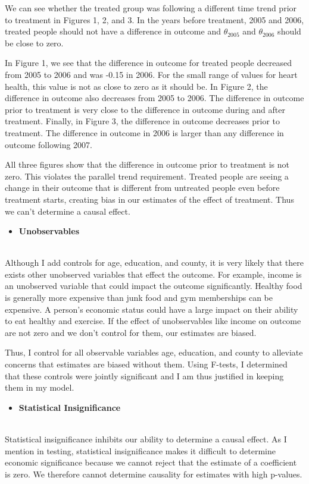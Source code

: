 \documentclass[a4paper]{article}
\begin{document}
We can see whether the treated group was following a different time trend prior to treatment in Figures 1, 2, and 3. In the years before treatment, 2005 and 2006, treated people should not have a difference in outcome and $\theta_{2005}$ and $\theta_{2006}$ should be close to zero. 

In Figure 1, we see that the difference in outcome for treated people decreased from 2005 to 2006 and was -0.15 in 2006. For the small range of values for heart health, this value is not as close to zero as it should be. In Figure 2, the difference in outcome also decreases from 2005 to 2006. The difference in outcome prior to treatment is very close to the difference in outcome during and after treatment. Finally, in Figure 3, the difference in outcome decreases prior to treatment. The difference in outcome in 2006 is larger than any difference in outcome following 2007.

All three figures show that the difference in outcome prior to treatment is not zero. This violates the parallel trend requirement. Treated people are seeing a change in their outcome that is different from untreated people even before treatment starts, creating bias in our estimates of the effect of treatment. Thus we can't determine a causal effect.

\begin{itemize}
\item \textbf{Unobservables}
\end{itemize}
\\
Although I add controls for age, education, and county, it is very likely that there exists other unobserved variables that effect the outcome. For example, income is an unobserved variable that could impact the outcome significantly. Healthy food is generally more expensive than junk food and gym memberships can be expensive. A person's economic status could have a large impact on their ability to eat healthy and exercise. If the effect of unobservables like income on outcome are not zero and we don't control for them, our estimates are biased.

Thus, I control for all observable variables age, education, and county to alleviate concerns that estimates are biased without them. Using F-tests, I determined that these controls were jointly significant and I am thus justified in keeping them in my model. 

\begin{itemize}
\item \textbf{Statistical Insignificance}
\end{itemize}
\\
Statistical insignificance inhibits our ability to determine a causal effect. As I mention in testing, statistical insignificance makes it difficult to determine economic significance because we cannot reject that the estimate of a coefficient is zero. We therefore cannot determine causality for estimates with high p-values.
\end{document}
